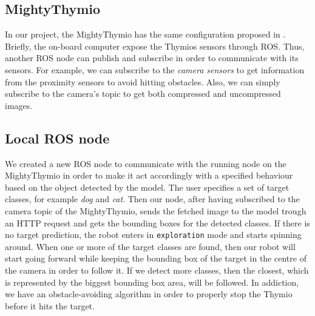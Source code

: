 \documentclass[letterpaper, 10 pt, conference]{ieeeconf}  %
\begin{document}
\subsection*{MightyThymio}

In our project, the MightyThymio has the same configuration proposed in \cite{guzzi2018eaai}. Briefly, the on-board computer expose the Thymios sensors through ROS. Thus, another ROS node can publish and subscribe in order to communicate with its sensors. For example, we can subscribe to the \emph{camera sensors} to get information from the proximity sensors to avoid hitting obstacles. Also, we can simply subscribe to the camera's topic to get both compressed and uncompressed images. 


\subsection*{Local ROS node}
We created a new ROS node to communicate with the running node on the MightyThymio in order to make it act accordingly with a specified behaviour based on the object detected by the model. The user specifies a set of target classes, for example \emph{dog} and \emph{cat}. Then our node, after having subscribed to the camera topic of the MightyThymio, sends the fetched image to the model trough an HTTP request and gets the bounding boxes for the detected classes. If there is no target prediction, the robot enters in \texttt{exploration} mode and starts spinning around. When one or more of the target classes are found, then our robot will start going forward while keeping the bounding box of the target in the centre of the camera in order to follow it. If we detect more classes, then the closest, which is represented by the biggest bounding box area, will be followed. In addiction, we have an obstacle-avoiding algorithm in order to properly stop the Thymio before it hits the target.
\end{document}
